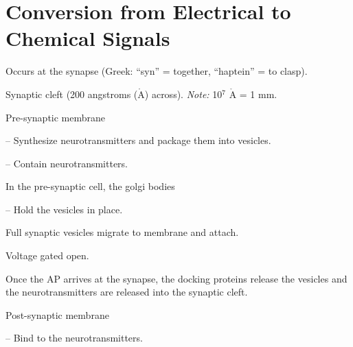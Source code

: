 \section{Conversion from Electrical to Chemical Signals}

\begin{coloredlist}
    \item Occurs at the synapse (Greek: ``syn'' = together, ``haptein'' = to clasp).
    \begin{coloredlist}
        \item Synaptic cleft (200 angstroms (\(\mathring{\text{A}}\)) across). \textit{Note:} 10\(^7\) \(\mathring{\text{A}}\) = 1 mm.
        \item Pre-synaptic membrane
        \begin{coloredlist}
            \item {} -- Synthesize neurotransmitters and package them into vesicles.
            \item {} -- Contain neurotransmitters.
            \begin{coloredlist}
                \item In the pre-synaptic cell, the golgi bodies 
            \end{coloredlist}
            \item {} -- Hold the vesicles in place.
            \begin{coloredlist}
                \item Full synaptic vesicles migrate to membrane and attach.
            \end{coloredlist}
            \item Voltage gated  open.
            \item Once the AP arrives at the synapse, the docking proteins release the vesicles and the neurotransmitters are released into the synaptic cleft.
        \end{coloredlist}
        \item Post-synaptic membrane
        \begin{coloredlist}
            \item {} -- Bind to the neurotransmitters.
        \end{coloredlist}
        
    \end{coloredlist}
\end{coloredlist}



